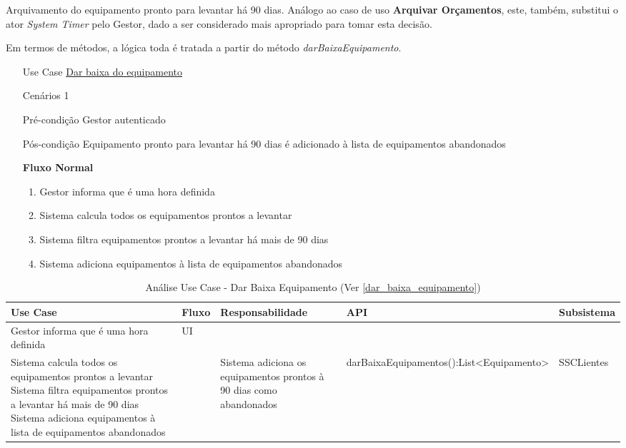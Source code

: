 \documentclass[../relatorio.tex]{subfiles}
\begin{document}
Arquivamento do equipamento pronto para levantar há 90 dias.
Análogo ao caso de uso \textbf{Arquivar Orçamentos}, este, também, substitui o ator \textit{System Timer}
pelo Gestor, dado a ser considerado mais apropriado para tomar esta decisão.

Em termos de métodos, a lógica toda é tratada a partir do método \textit{darBaixaEquipamento}.
\begin{itemize}
    \item[Use Case] {\underline{Dar baixa do equipamento}}
    \item[Cenários] {1}
    \item[Pré-condição] {Gestor autenticado}
    \item[Pós-condição] {Equipamento pronto para levantar há 90 dias é adicionado à lista de equipamentos abandonados}
          \begin{flushleft}
              \textbf{Fluxo Normal}
          \end{flushleft}
          \begin{enumerate}
              \item Gestor informa que é uma hora definida
              \item Sistema calcula todos os equipamentos prontos a levantar
              \item Sistema filtra equipamentos prontos a levantar há mais de 90 dias
              \item Sistema adiciona equipamentos à lista de equipamentos abandonados
          \end{enumerate}
\end{itemize}
\begin{landscape}
    \begin{table}[!h]
        \centering
        \begin{tabular}{|p{5cm}|p{1cm}|p{4cm}|p{6cm}|p{3cm}|}
            \hline
            \rowcolor{gray!20!white}
            Use Case & Fluxo & Responsabilidade & API & Subsistema \\
            \hline
            \rowcolor{yellow}
            Gestor informa que é uma hora definida
                     & UI
                     &
                     &
                     &
            \\
            \hline
            Sistema calcula todos os equipamentos prontos a levantar 
            Sistema filtra equipamentos prontos a levantar há mais de 90 dias
            Sistema adiciona equipamentos à lista de equipamentos abandonados
            \hline
                     & 
                     & Sistema adiciona os equipamentos prontos à 90 dias como abandonados
                     & darBaixaEquipamentos():List<Equipamento>
                     & SSCLientes
            \\
            \hline
        \end{tabular}
        \caption{Análise Use Case - Dar Baixa Equipamento (Ver \ref{dar_baixa_equipamento})}
    \end{table}
\end{landscape}
\end{document}
